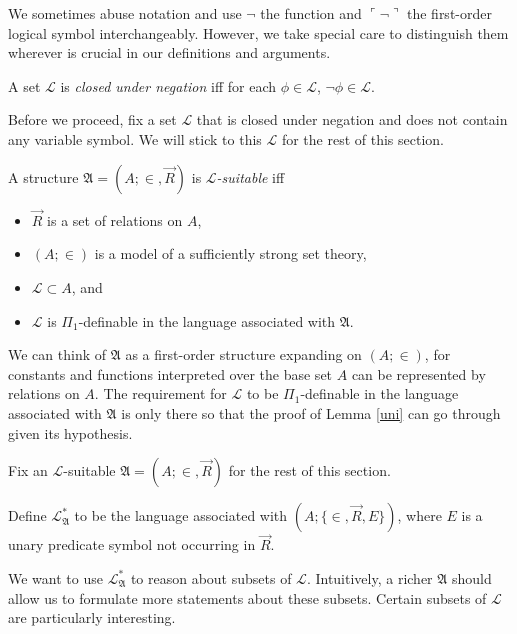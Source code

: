 \documentclass[12pt]{article}
\numberwithin{equation}{section}
\begin{document}
We sometimes abuse notation and use $\neg$ the function and $\ulcorner \neg \urcorner$ the first-order logical symbol interchangeably. However, we take special care to distinguish them wherever is crucial in our definitions and arguments.

\begin{defi}
A set $\mathcal{L}$ is \emph{closed under negation} iff for each $\phi \in \mathcal{L}$, $\neg \phi \in \mathcal{L}$.
\end{defi}

Before we proceed, fix a set $\mathcal{L}$ that is closed under negation and does not contain any variable symbol. We will stick to this $\mathcal{L}$ for the rest of this section.

\begin{defi}\label{lsuitable}
A structure $\mathfrak{A} = (A; \in, \Vec{R})$ is $\mathcal{L}$\emph{-suitable} iff
\begin{itemize}
    \item $\Vec{R}$ is a set of relations on $A$,
    \item $(A; \in)$ is a model of a sufficiently strong set theory,
    \item $\mathcal{L} \subset A$, and
    \item $\mathcal{L}$ is $\Pi_1$-definable in the language associated with $\mathfrak{A}$.
\end{itemize}
\end{defi}

We can think of $\mathfrak{A}$ as a first-order structure expanding on $(A; \in)$, for constants and functions interpreted over the base set $A$ can be represented by relations on $A$. The requirement for $\mathcal{L}$ to be $\Pi_1$-definable in the language associated with $\mathfrak{A}$ is only there so that the proof of Lemma \ref{uni} can go through given its hypothesis.

Fix an $\mathcal{L}$-suitable $\mathfrak{A} = (A; \in, \Vec{R})$ for the rest of this section.

\begin{defi}
Define $\mathcal{L}^{*}_{\mathfrak{A}}$ to be the language associated with $(A; \{\in, \Vec{R}, E\})$, where $E$ is a unary predicate symbol not occurring in $\Vec{R}$. 
\end{defi}

We want to use $\mathcal{L}^{*}_{\mathfrak{A}}$ to reason about subsets of $\mathcal{L}$. Intuitively, a richer $\mathfrak{A}$ should allow us to formulate more statements about these subsets. Certain subsets of $\mathcal{L}$ are particularly interesting.
\end{document}
